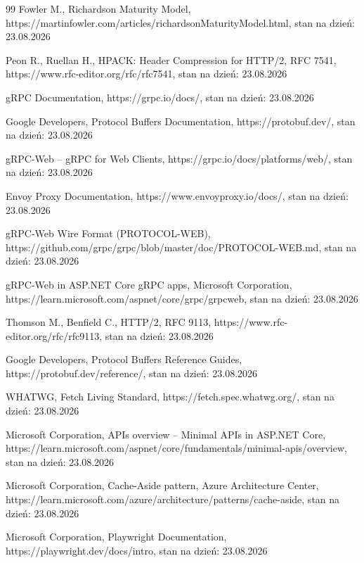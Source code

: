 \documentclass{PracaDyplomowa}
\begin{document}
\begin{thebibliography}{99}
 Fowler M., Richardson Maturity Model, https://martinfowler.com/articles/richardsonMaturityModel.html, stan na dzień: 23.08.2026

 Peon R., Ruellan H., HPACK: Header Compression for HTTP/2, RFC 7541, https://www.rfc-editor.org/rfc/rfc7541, stan na dzień: 23.08.2026

 gRPC Documentation, https://grpc.io/docs/, stan na dzień: 23.08.2026

 Google Developers, Protocol Buffers Documentation, https://protobuf.dev/, stan na dzień: 23.08.2026


 gRPC-Web -- gRPC for Web Clients, https://grpc.io/docs/platforms/web/, stan na dzień: 23.08.2026

 Envoy Proxy Documentation, https://www.envoyproxy.io/docs/, stan na dzień: 23.08.2026

 gRPC-Web Wire Format (PROTOCOL-WEB), https://github.com/grpc/grpc/blob/master/doc/PROTOCOL-WEB.md, stan na dzień: 23.08.2026

 gRPC-Web in ASP.NET Core gRPC apps, Microsoft Corporation, https://learn.microsoft.com/aspnet/core/grpc/grpcweb, stan na dzień: 23.08.2026

 Thomson M., Benfield C., HTTP/2, RFC 9113, https://www.rfc-editor.org/rfc/rfc9113, stan na dzień: 23.08.2026

 Google Developers, Protocol Buffers Reference Guides, https://protobuf.dev/reference/, stan na dzień: 23.08.2026

 WHATWG, Fetch Living Standard, https://fetch.spec.whatwg.org/, stan na dzień: 23.08.2026


 Microsoft Corporation, APIs overview -- Minimal APIs in ASP.NET Core, https://learn.microsoft.com/aspnet/core/fundamentals/minimal-apis/overview, stan na dzień: 23.08.2026

 Microsoft Corporation, Cache-Aside pattern, Azure Architecture Center, https://learn.microsoft.com/azure/architecture/patterns/cache-aside, stan na dzień: 23.08.2026


 Microsoft Corporation, Playwright Documentation, https://playwright.dev/docs/intro, stan na dzień: 23.08.2026


\end{thebibliography}
\end{document}

